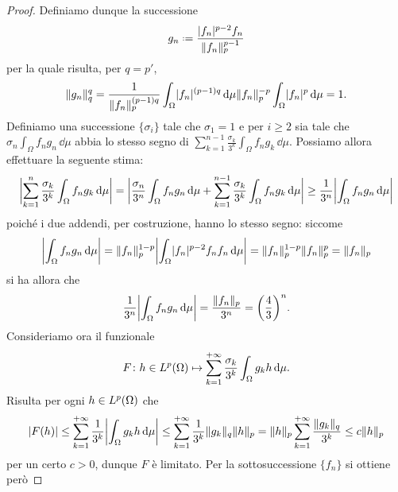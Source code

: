 \begin{proof}
    Definiamo dunque la successione
    \begin{equation}
        g_n\defeq\frac{\abs{f_n}^{p-2}f_n}{\norm{f_n}_p^{p-1}}
    \end{equation}
    per la quale risulta, per $q=p'$,
    \begin{equation}
        \norm{g_n}_q^q=
        \frac1{\norm{f_n}_p^{(p-1)q}}\int_\Omega \abs{f_n}^{(p-1)q}\,\dd\mu
        \norm{f_n}_p^{-p}\int_\Omega \abs{f_n}^{p}\,\dd\mu=
        1.
    \end{equation}
    Definiamo una successione $\{\sigma_i\}$ tale che $\sigma_1=1$ e per $i\ge 2$ sia tale che $\sigma_n\int_\Omega f_ng_n\,\dd\mu$ abbia lo stesso segno di $\sum_{k=1}^{n-1}\frac{\sigma_k}{3^k}\int_\Omega f_ng_k\,\dd\mu$.
    Possiamo allora effettuare la seguente stima:
    \begin{equation}
        \abs[\bigg]{\sum_{k=1}^n\frac{\sigma_k}{3^k}\int_\Omega f_ng_k\,\dd\mu}=
        \abs[\bigg]{\frac{\sigma_n}{3^n}\int_\Omega f_ng_n\,\dd\mu+\sum_{k=1}^{n-1}\frac{\sigma_k}{3^k}\int_\Omega f_ng_k\,\dd\mu}\ge
        \frac1{3^n}\abs[\bigg]{\int_\Omega f_ng_n\,\dd\mu}
    \end{equation}
    poich\'e i due addendi, per costruzione, hanno lo stesso segno: siccome
    \begin{equation}
        \abs[\bigg]{\int_\Omega f_ng_n\,\dd\mu}=
        \norm{f_n}_p^{1-p}\abs[\bigg]{\int_\Omega \abs{f_n}^{p-2}f_nf_n\,\dd\mu}=
        \norm{f_n}_p^{1-p}\norm{f_n}_p^p=
        \norm{f_n}_p
    \end{equation}
    si ha allora che
    \begin{equation}
        \frac1{3^n}\abs[\bigg]{\int_\Omega f_ng_n\,\dd\mu}=
        \frac{\norm{f_n}_p}{3^n}=\biggl(\frac43\biggr)^n.
    \end{equation}
    Consideriamo ora il funzionale
    \begin{equation}
        F\colon h\in\leb[p]{\Omega}\mapsto\sum_{k=1}^{+\infty}\frac{\sigma_k}{3^k}\int_\Omega g_kh\,\dd\mu.
    \end{equation}
    Risulta per ogni $h\in\leb[p]{\Omega}$ che
    \begin{equation}
        \abs{F(h)}\le
        \sum_{k=1}^{+\infty}\frac1{3^k}\abs[\bigg]{\int_\Omega g_kh\,\dd\mu}\le
        \sum_{k=1}^{+\infty}\frac1{3^k}\norm{g_k}_q\norm{h}_p=
        \norm{h}_p\sum_{k=1}^{+\infty}\frac{\norm{g_k}_q}{3^k}\le
        c\norm{h}_p
    \end{equation}
    per un certo $c>0$, dunque $F$ è limitato.
    Per la sottosuccessione $\{f_n\}$ si ottiene però

\end{proof}
